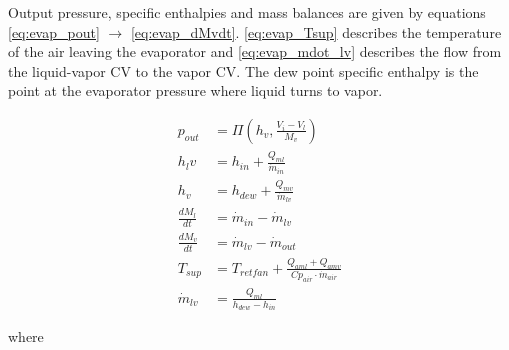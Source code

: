 \medskip
Output pressure, specific enthalpies and mass balances are given by equations \cref{eq:evap_pout} $\rightarrow$ \cref{eq:evap_dMvdt}. \cref{eq:evap_Tsup} describes the temperature of the air leaving the evaporator and \cref{eq:evap_mdot_lv} describes the flow from the liquid-vapor CV to the vapor CV. The dew point specific enthalpy is the point at the evaporator pressure where liquid turns to vapor.

\begin{align}
	p_{out}         & = \Pi \left( h_v, \frac{V_i-V_l}{M_v} \right)		\label{eq:evap_pout}                       \\
	h_lv             & = h_{in} + \frac{Q_{ml}}{\dot{m}_{in}}                                                       \\
	h_v             & = h_{dew} + \frac{Q_{mv}}{\dot{m}_{lv}}                                                       \\
	\frac{dM_l}{dt} & = \dot{m}_{in} - \dot{m}_{lv}                                                                \\
	\frac{dM_v}{dt} & = \dot{m}_{lv} - \dot{m}_{out}                   \label{eq:evap_dMvdt}                       \\
	T_{sup}         & = T_{retfan} +  \frac{Q_{aml} + Q_{amv}}{Cp_{air} \cdot \dot{m}_{air}} \label{eq:evap_Tsup} \\
	\dot{m}_{lv}    & = \frac{Q_{ml}}{h_{dew} - h_{in}} \label{eq:evap_mdot_lv}
\end{align}



where\\


